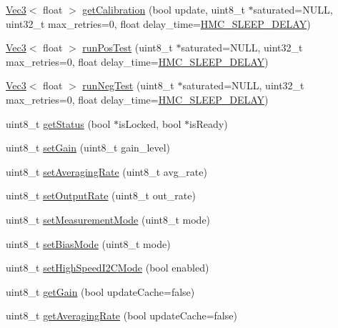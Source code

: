 \begin{DoxyCompactItemize}
\item 
\hyperlink{struct_vec3}{Vec3}$<$ float $>$ \hyperlink{class_h_m_c5883_l_afe8557a9869b1b8be968db2eb26eb373}{get\+Calibration} (bool update, uint8\+\_\+t $\ast$saturated=N\+U\+L\+L, uint32\+\_\+t max\+\_\+retries=0, float delay\+\_\+time=\hyperlink{group___general_constants_ga26afbcf737f1add055ea8929c03648a9}{H\+M\+C\+\_\+\+S\+L\+E\+E\+P\+\_\+\+D\+E\+L\+A\+Y})
\item 
\hyperlink{struct_vec3}{Vec3}$<$ float $>$ \hyperlink{class_h_m_c5883_l_a041550377640f94f3d78cac70a781093}{run\+Pos\+Test} (uint8\+\_\+t $\ast$saturated=N\+U\+L\+L, uint32\+\_\+t max\+\_\+retries=0, float delay\+\_\+time=\hyperlink{group___general_constants_ga26afbcf737f1add055ea8929c03648a9}{H\+M\+C\+\_\+\+S\+L\+E\+E\+P\+\_\+\+D\+E\+L\+A\+Y})
\item 
\hyperlink{struct_vec3}{Vec3}$<$ float $>$ \hyperlink{class_h_m_c5883_l_a6285036cc2d7c6f320b5eda766cf71e5}{run\+Neg\+Test} (uint8\+\_\+t $\ast$saturated=N\+U\+L\+L, uint32\+\_\+t max\+\_\+retries=0, float delay\+\_\+time=\hyperlink{group___general_constants_ga26afbcf737f1add055ea8929c03648a9}{H\+M\+C\+\_\+\+S\+L\+E\+E\+P\+\_\+\+D\+E\+L\+A\+Y})
\item 
uint8\+\_\+t \hyperlink{class_h_m_c5883_l_ad68af7d6a31a0ab313c6aa887512f861}{get\+Status} (bool $\ast$is\+Locked, bool $\ast$is\+Ready)
\item 
uint8\+\_\+t \hyperlink{class_h_m_c5883_l_ac5d70ea9d043a7829d3410b6ed42d72d}{set\+Gain} (uint8\+\_\+t gain\+\_\+level)
\item 
uint8\+\_\+t \hyperlink{class_h_m_c5883_l_aed6ab6cfe07eafee7d99012dc092e41d}{set\+Averaging\+Rate} (uint8\+\_\+t avg\+\_\+rate)
\item 
uint8\+\_\+t \hyperlink{class_h_m_c5883_l_a5c4eda2a75638936d50b25484b96147f}{set\+Output\+Rate} (uint8\+\_\+t out\+\_\+rate)
\item 
uint8\+\_\+t \hyperlink{class_h_m_c5883_l_a6d584d734dfe62dad7ac7e32174285e9}{set\+Measurement\+Mode} (uint8\+\_\+t mode)
\item 
uint8\+\_\+t \hyperlink{class_h_m_c5883_l_af5b858a870f8f961d5540a18393eabf0}{set\+Bias\+Mode} (uint8\+\_\+t mode)
\item 
uint8\+\_\+t \hyperlink{class_h_m_c5883_l_a44596be4b636171ac21f3b80a6f46ee0}{set\+High\+Speed\+I2\+C\+Mode} (bool enabled)
\item 
uint8\+\_\+t \hyperlink{class_h_m_c5883_l_aec9eb6926b5f7461abbad1a63943071f}{get\+Gain} (bool update\+Cache=false)
\item 
uint8\+\_\+t \hyperlink{class_h_m_c5883_l_a6652a9c55333f6fd2aac541f57a692fc}{get\+Averaging\+Rate} (bool update\+Cache=false)

\end{DoxyCompactItemize}
